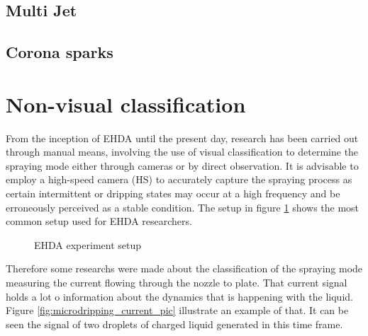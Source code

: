 \subsection{Multi Jet}
\label{subsec:Multi Jet}

\subsection{Corona sparks}
\label{subsec:Corona sparks}


\section{Non-visual classification}
\label{sec:non-visual-classification}

From the inception of EHDA until the present day, research has been carried out through manual means, involving the use of visual classification to determine the spraying mode either through cameras or by direct observation. It is advisable to employ a high-speed camera (HS) to accurately capture the spraying process as certain intermittent or dripping states may occur at a high frequency and be erroneously perceived as a stable condition.
The setup in figure \ref{fig:ehda_setup} shows the most common setup used for EHDA researchers.

\begin{figure}[H]
  \centering
  \caption{EHDA experiment setup \cite{Luewton}}
  \label{fig:ehda_setup}
\end{figure}


Therefore some researchs were made about the classification of the spraying mode measuring the current flowing through the nozzle to plate\cite{Sjaaks}\cite{Chen_Pui}. That current signal holds a lot o information 
about the dynamics that is happening with the liquid. Figure \ref{fig:microdripping_current_pic} illustrate an example of that. It can be seen the signal of two droplets of charged liquid generated in this time frame.


